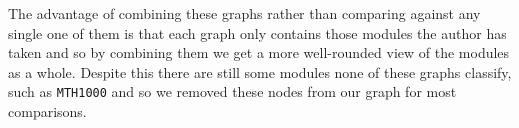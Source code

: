 \documentclass[english, 12pt]{article}
\begin{document}
The advantage of combining these graphs rather than comparing against any single one of them is that each graph only contains those modules the author has taken and so by combining them we get a more well-rounded view of the modules as a whole. Despite this there are still some modules none of these graphs classify, such as \texttt{MTH1000} and so we removed these nodes from our graph for most comparisons.

\printbibliography
\end{document}
